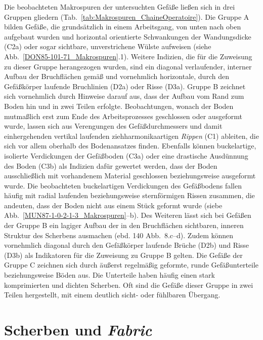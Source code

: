 \begin{multicols}{2}
\vspace{1.5em}
\noindent Die beobachteten Makrospuren der untersuchten Gefäße ließen sich in drei Gruppen gliedern (Tab.~\ref{tab:Makrospuren_ChaineOperatoire}). Die Gruppe A bilden Gefäße, die grundsätzlich in einem Arbeitsgang, von unten nach oben aufgebaut wurden und horizontal orientierte Schwankungen der Wandungsdicke (C2a) oder sogar sichtbare, unverstrichene Wülste aufweisen (siehe Abb.~\ref{DON85-101-71_Makrospuren}.1). Weitere Indizien, die für die Zuweisung zu dieser Gruppe herangezogen wurden, sind ein diagonal verlaufender, interner Aufbau der Bruchflächen gemäß \textcite[140 Abb.~8.b]{Lindahl.2010} und vornehmlich horizontale, durch den Gefäßkörper laufende Bruchlinien (D2a) oder Risse (D3a). Gruppe B zeichnet sich vornehmlich durch Hinweise darauf aus, dass der Aufbau vom Rand zum Boden hin und in zwei Teilen erfolgte. Beobachtungen, wonach der Boden mutmaßlich erst zum Ende des Arbeitsprozesses geschlossen oder ausgeformt wurde, lassen sich aus Verengungen des Gefäßdurchmessers und damit einhergehenden vertikal laufenden ziehharmonikaartigen \textit{Rippen} (C1) ableiten, die sich vor allem oberhalb des Bodenansatzes finden. Ebenfalls können buckelartige, isolierte Verdickungen der Gefäßboden (C3a) oder eine drastische Ausdünnung des Boden (C3b) als Indizien dafür gewertet werden, dass der Boden ausschließlich mit vorhandenem Material geschlossen beziehungsweise ausgeformt wurde. Die beobachteten buckelartigen Verdickungen des Gefäßbodens fallen häufig mit radial laufenden beziehungsweise sternförmigen Rissen zusammen, die andeuten, dass der Boden nicht aus einem Stück geformt wurde (siebe Abb.~\ref{MUN87-1-0-2-1-3_Makrospuren}--b). Des Weiteren lässt sich bei Gefäßen der Gruppe B ein lagiger Aufbau der in den Bruchflächen sichtbaren, inneren Struktur des Scherbens ausmachen (ebd. 140 Abb.~8.c--d). Zudem können vornehmlich diagonal durch den Gefäßkörper laufende Brüche (D2b) und Risse (D3b) als Indikatoren für die Zuweisung zu Gruppe B gelten. Die Gefäße der Gruppe C zeichnen sich durch äußerst regelmäßig geformte, runde Gefäßunterteile beziehungsweise Böden aus. Die Unterteile haben häufig einen stark komprimierten und dichten Scherben. Oft sind die Gefäße dieser Gruppe in zwei Teilen hergestellt, mit einem deutlich sicht- oder fühlbaren Übergang. 


\section{Scherben und \textit{Fabric}}\label{sec:Herstellung2_Fabric}


\end{multicols}

